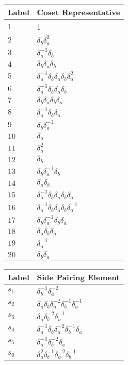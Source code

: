 \documentclass{article}
\begin{document}
\begin{center}
\begin{tabular}{ll}
\toprule
Label & Coset Representative\\
\midrule
$1$ & 1 \\
$2$ & $\delta_b^{}\delta_a^{2}$ \\
$3$ & $\delta_a^{-1}\delta_b^{}$ \\
$4$ & $\delta_b^{}\delta_a^{}\delta_b^{}$ \\
$5$ & $\delta_a^{-1}\delta_b^{}\delta_a^{}\delta_b^{}\delta_a^{2}$ \\
$6$ & $\delta_a^{-1}\delta_b^{}\delta_a^{}\delta_b^{}$ \\
$7$ & $\delta_b^{}\delta_a^{}\delta_b^{}\delta_a^{}$ \\
$8$ & $\delta_a^{-1}\delta_b^{}\delta_a^{}$ \\
$9$ & $\delta_b^{}\delta_a^{-1}$ \\
$10$ & $\delta_a^{}$ \\
$11$ & $\delta_a^{2}$ \\
$12$ & $\delta_b^{}$ \\
$13$ & $\delta_b^{}\delta_a^{-1}\delta_b^{}$ \\
$14$ & $\delta_a^{}\delta_b^{}$ \\
$15$ & $\delta_a^{-1}\delta_b^{}\delta_a^{}\delta_b^{}\delta_a^{}$ \\
$16$ & $\delta_a^{-1}\delta_b^{}\delta_a^{}\delta_b^{}\delta_a^{-1}$ \\
$17$ & $\delta_b^{}\delta_a^{-1}\delta_b^{}\delta_a^{}$ \\
$18$ & $\delta_a^{}\delta_b^{}\delta_a^{}$ \\
$19$ & $\delta_a^{-1}$ \\
$20$ & $\delta_b^{}\delta_a^{}$ \\
\bottomrule
\end{tabular}
\hfill
\begin{tabular}{ll}
\toprule
Label & Side Pairing Element\\
\midrule
$s_{1}$ & $\delta_b^{-1}\delta_a^{-2}$ \\
$s_{2}$ & $\delta_a^{}\delta_b^{}\delta_a^{-2}\delta_b^{-1}\delta_a^{-1}$ \\
$s_{3}$ & $\delta_a^{}\delta_b^{-2}\delta_a^{-1}$ \\
$s_{4}$ & $\delta_a^{-1}\delta_b^{}\delta_a^{-2}\delta_b^{-1}\delta_a^{}$ \\
$s_{5}$ & $\delta_a^{-1}\delta_b^{-2}\delta_a^{}$ \\
$s_{6}$ & $\delta_a^{2}\delta_b^{-1}\delta_a^{-2}\delta_b^{-1}$ \\

\end{tabular}
\end{center}
\end{document}

